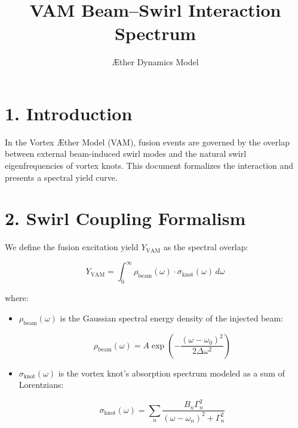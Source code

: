 \documentclass{article}
\title{VAM Beam--Swirl Interaction Spectrum}
\author{Æther Dynamics Model}
\date{}
\begin{document}
\maketitle






\section*{1. Introduction}


In the Vortex Æther Model (VAM), fusion events are governed by the overlap between external beam-induced swirl modes and the natural swirl eigenfrequencies of vortex knots. This document formalizes the interaction and presents a spectral yield curve.






\section*{2. Swirl Coupling Formalism}


We define the fusion excitation yield $Y_{\mathrm{VAM}}$ as the spectral overlap:






\begin{equation}


Y_{\mathrm{VAM}} = \int_0^\infty \rho_{\mathrm{beam}}(\omega) \cdot \sigma_{\mathrm{knot}}(\omega) \, d\omega


\end{equation}






\noindent where:


\begin{itemize}


  \item $\rho_{\mathrm{beam}}(\omega)$ is the Gaussian spectral energy density of the injected beam:


  \[


  \rho_{\mathrm{beam}}(\omega) = A \exp\left(-\frac{(\omega - \omega_0)^2}{2 \Delta \omega^2} \right)


  \]


  \item $\sigma_{\mathrm{knot}}(\omega)$ is the vortex knot's absorption spectrum modeled as a sum of Lorentzians:


  \[


  \sigma_{\mathrm{knot}}(\omega) = \sum_n \frac{B_n \Gamma_n^2}{(\omega - \omega_n)^2 + \Gamma_n^2}


  \]


\end{itemize}
\end{document}
